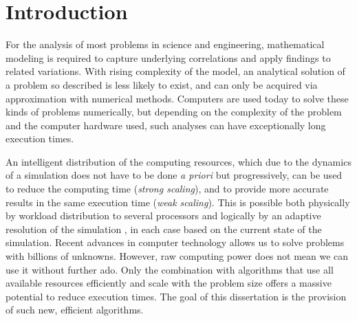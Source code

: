 \chapter{Introduction}
\label{ch:introduction}
\glsresetall

%  


For the analysis of most problems in science and engineering, mathematical modeling is required to capture underlying correlations and apply findings to related variations. With rising complexity of the model, an analytical solution of a problem so described is less likely to exist, and can only be acquired via approximation with numerical methods. Computers are used today to solve these kinds of problems numerically, but depending on the complexity of the problem and the computer hardware used, such analyses can have exceptionally long execution times.

An intelligent distribution of the computing resources, which due to the dynamics of a simulation does not have to be done \textit{a priori} but progressively, can be used to reduce the computing time (\textit{strong scaling}), and to provide more accurate results in the same execution time (\textit{weak scaling}). This is possible both physically by workload distribution to several processors
and logically by
an adaptive resolution of the simulation%
, in each case based on the current state of the simulation.
Recent advances in computer technology allows us to solve problems with billions of unknowns. However, raw computing power does not mean we can use it without further ado. Only the combination with algorithms that use all available resources efficiently and scale with the problem size offers a massive potential to reduce execution times.
The goal of this dissertation is the provision of such new, efficient algorithms.

